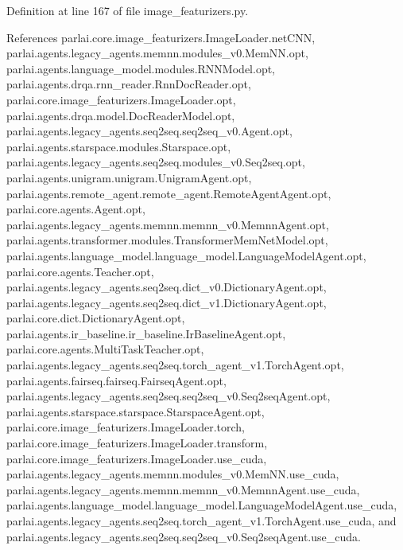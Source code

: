 Definition at line 167 of file image\+\_\+featurizers.\+py.



References parlai.\+core.\+image\+\_\+featurizers.\+Image\+Loader.\+net\+C\+NN, parlai.\+agents.\+legacy\+\_\+agents.\+memnn.\+modules\+\_\+v0.\+Mem\+N\+N.\+opt, parlai.\+agents.\+language\+\_\+model.\+modules.\+R\+N\+N\+Model.\+opt, parlai.\+agents.\+drqa.\+rnn\+\_\+reader.\+Rnn\+Doc\+Reader.\+opt, parlai.\+core.\+image\+\_\+featurizers.\+Image\+Loader.\+opt, parlai.\+agents.\+drqa.\+model.\+Doc\+Reader\+Model.\+opt, parlai.\+agents.\+legacy\+\_\+agents.\+seq2seq.\+seq2seq\+\_\+v0.\+Agent.\+opt, parlai.\+agents.\+starspace.\+modules.\+Starspace.\+opt, parlai.\+agents.\+legacy\+\_\+agents.\+seq2seq.\+modules\+\_\+v0.\+Seq2seq.\+opt, parlai.\+agents.\+unigram.\+unigram.\+Unigram\+Agent.\+opt, parlai.\+agents.\+remote\+\_\+agent.\+remote\+\_\+agent.\+Remote\+Agent\+Agent.\+opt, parlai.\+core.\+agents.\+Agent.\+opt, parlai.\+agents.\+legacy\+\_\+agents.\+memnn.\+memnn\+\_\+v0.\+Memnn\+Agent.\+opt, parlai.\+agents.\+transformer.\+modules.\+Transformer\+Mem\+Net\+Model.\+opt, parlai.\+agents.\+language\+\_\+model.\+language\+\_\+model.\+Language\+Model\+Agent.\+opt, parlai.\+core.\+agents.\+Teacher.\+opt, parlai.\+agents.\+legacy\+\_\+agents.\+seq2seq.\+dict\+\_\+v0.\+Dictionary\+Agent.\+opt, parlai.\+agents.\+legacy\+\_\+agents.\+seq2seq.\+dict\+\_\+v1.\+Dictionary\+Agent.\+opt, parlai.\+core.\+dict.\+Dictionary\+Agent.\+opt, parlai.\+agents.\+ir\+\_\+baseline.\+ir\+\_\+baseline.\+Ir\+Baseline\+Agent.\+opt, parlai.\+core.\+agents.\+Multi\+Task\+Teacher.\+opt, parlai.\+agents.\+legacy\+\_\+agents.\+seq2seq.\+torch\+\_\+agent\+\_\+v1.\+Torch\+Agent.\+opt, parlai.\+agents.\+fairseq.\+fairseq.\+Fairseq\+Agent.\+opt, parlai.\+agents.\+legacy\+\_\+agents.\+seq2seq.\+seq2seq\+\_\+v0.\+Seq2seq\+Agent.\+opt, parlai.\+agents.\+starspace.\+starspace.\+Starspace\+Agent.\+opt, parlai.\+core.\+image\+\_\+featurizers.\+Image\+Loader.\+torch, parlai.\+core.\+image\+\_\+featurizers.\+Image\+Loader.\+transform, parlai.\+core.\+image\+\_\+featurizers.\+Image\+Loader.\+use\+\_\+cuda, parlai.\+agents.\+legacy\+\_\+agents.\+memnn.\+modules\+\_\+v0.\+Mem\+N\+N.\+use\+\_\+cuda, parlai.\+agents.\+legacy\+\_\+agents.\+memnn.\+memnn\+\_\+v0.\+Memnn\+Agent.\+use\+\_\+cuda, parlai.\+agents.\+language\+\_\+model.\+language\+\_\+model.\+Language\+Model\+Agent.\+use\+\_\+cuda, parlai.\+agents.\+legacy\+\_\+agents.\+seq2seq.\+torch\+\_\+agent\+\_\+v1.\+Torch\+Agent.\+use\+\_\+cuda, and parlai.\+agents.\+legacy\+\_\+agents.\+seq2seq.\+seq2seq\+\_\+v0.\+Seq2seq\+Agent.\+use\+\_\+cuda.



